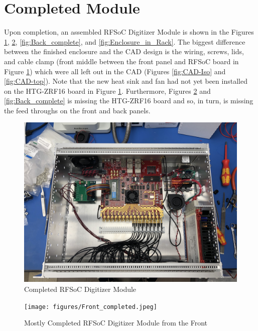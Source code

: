 \documentclass[12pt,a4paper,oneside]{article}
\begin{document}
\section{Completed Module}
\label{sec:7}

Upon completion, an assembled RFSoC Digitizer Module is shown in the Figures \ref{fig:Enclosure_above}, \ref{fig:Front_completed}, \ref{fig:Back_complete}, and \ref{fig:Enclosure_in_Rack}. The biggest difference between the finished enclosure and the CAD design is the wiring, screws, lids, and cable clamp (front middle between the front panel and RFSoC board in Figure \ref{fig:Enclosure_above}) which were all left out in the CAD (Figures \ref{fig:CAD-Iso} and \ref{fig:CAD-top}). Note that the new heat sink and fan had not yet been installed on the HTG-ZRF16 board in Figure \ref{fig:Enclosure_above}. Furthermore, Figures  \ref{fig:Front_completed} and \ref{fig:Back_complete} is missing the HTG-ZRF16
board and so, in turn, is missing the feed throughs on the front and back panels.


\begin{figure}[H]
\centering
\includegraphics[width=1\linewidth]{figures/Finished_top_view.jpeg}
\caption{Completed RFSoC Digitizer Module}
\label{fig:Enclosure_above}
\end{figure}

\begin{figure}[H]
\centering
\texttt{[image: figures/Front\_completed.jpeg]}
\caption{Mostly Completed RFSoC Digitizer Module from the Front}
\label{fig:Front_completed}
\end{figure}
\end{document}
